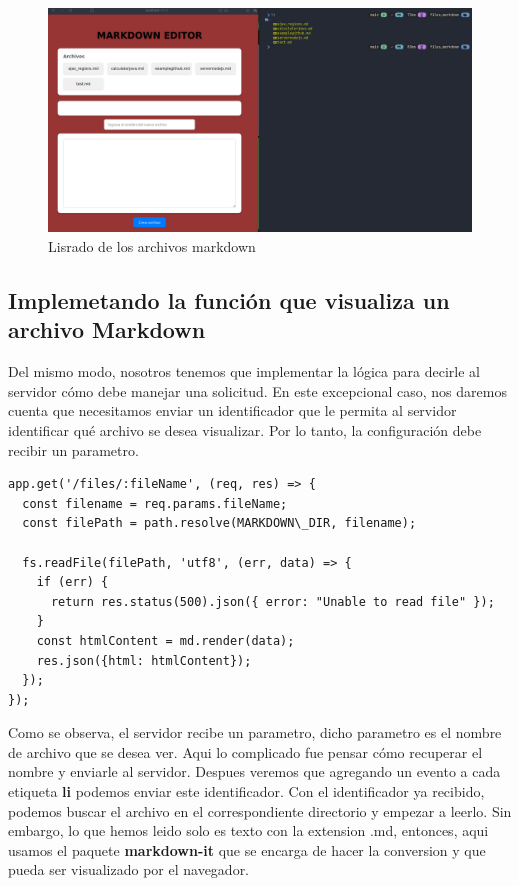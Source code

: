 \begin{figure}[H]
  \centering
  \includegraphics[width=1.0\textwidth]{img/list_markdown.png}
  \caption{Lisrado de los archivos markdown}
\end{figure}

\subsection{Implemetando la función que visualiza un archivo Markdown}
Del mismo modo, nosotros tenemos que implementar la lógica para decirle al servidor cómo debe manejar una solicitud. En este excepcional caso, nos daremos cuenta que necesitamos enviar un identificador que le permita al servidor identificar qué archivo se desea visualizar. Por lo tanto, la configuración debe recibir un parametro.

\begin{verbatim}
app.get('/files/:fileName', (req, res) => {
  const filename = req.params.fileName;
  const filePath = path.resolve(MARKDOWN\_DIR, filename);
  
  fs.readFile(filePath, 'utf8', (err, data) => {
    if (err) {
      return res.status(500).json({ error: "Unable to read file" });
    }
    const htmlContent = md.render(data);
    res.json({html: htmlContent});
  });
});
\end{verbatim}

Como se observa, el servidor recibe un parametro, dicho parametro es el nombre de archivo que se desea ver. Aqui lo complicado fue pensar cómo recuperar el nombre y enviarle al servidor. Despues veremos que agregando un evento a cada etiqueta \textbf{li} podemos enviar este identificador.
\singlespacing
Con el identificador ya recibido, podemos buscar el archivo en el correspondiente directorio y empezar a leerlo. Sin embargo, lo que hemos leido solo es texto con la extension .md, entonces, aqui usamos el paquete \textbf{markdown-it} que se encarga de hacer la conversion y que pueda ser visualizado por el navegador.

